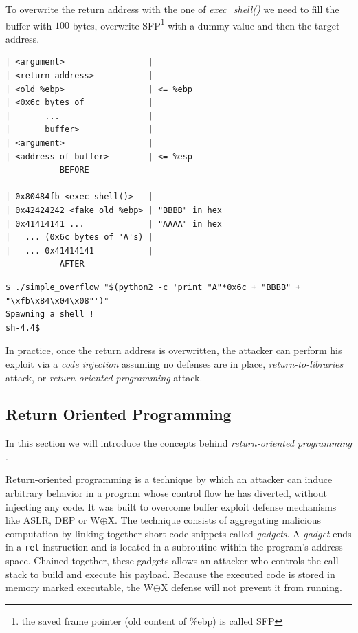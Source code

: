 \documentclass[10pt,twocolumn]{article}
\begin{document}
To overwrite the return address with the one
of \textit{exec\_shell()} we need to fill the buffer with $100$ bytes, overwrite
SFP\footnote{the saved frame pointer (old content of \%ebp) is called SFP} with a
dummy value and then the target address.

\begin{lstlisting}[aboveskip=\bigskipamount,belowskip=\medskipamount,caption=Stack before and after overflow]
| <argument>                 |
| <return address>           |
| <old %ebp>                 | <= %ebp
| <0x6c bytes of             |
|       ...                  |
|       buffer>              |
| <argument>                 |
| <address of buffer>        | <= %esp
           BEFORE

| 0x80484fb <exec_shell()>   |
| 0x42424242 <fake old %ebp> | "BBBB" in hex
| 0x41414141 ...             | "AAAA" in hex
|   ... (0x6c bytes of 'A's) |
|   ... 0x41414141           |
           AFTER
\end{lstlisting}


\begin{lstlisting}[float=h]
$ ./simple_overflow "$(python2 -c 'print "A"*0x6c + "BBBB" + "\xfb\x84\x04\x08"')"
Spawning a shell !
sh-4.4$
\end{lstlisting}

In practice, once the return address is overwritten, the attacker can perform his exploit via a \textit{code
injection} assuming no defenses are in place, \textit{return-to-libraries}
attack, or \textit{return oriented programming} attack.

\subsection{Return Oriented Programming}
In this section we will introduce the concepts behind \textit{return-oriented programming
}\cite{roemer_return-oriented_2012}.

Return-oriented programming is a technique by which an attacker can induce
arbitrary behavior in a program whose control flow he has diverted, without
injecting any code. It was built to overcome buffer exploit defense
mechanisms like ASLR, DEP or W$\oplus$X. The technique consists of aggregating
malicious computation by linking together short code snippets called
\textit{gadgets}.  A \textit{gadget} ends in a \texttt{ret} instruction and is
located in a subroutine within the program's address space. Chained together,
these gadgets allows an attacker who controls the call stack to build and
execute his payload. Because the executed code is stored in memory marked
executable, the W$\oplus$X defense will not prevent it from running.
\end{document}
